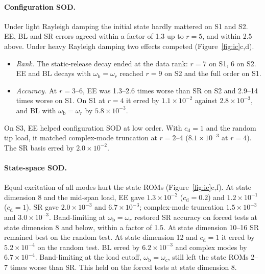 \documentclass[preprint,12pt]{elsarticle}
\begin{document}
\paragraph{Configuration SOD.} Under light Rayleigh damping the initial state hardly mattered on S1 and S2. EE, BL and SR errors agreed within a factor of 1.3 up to $r=5$, and within 2.5 above.
Under heavy Rayleigh damping two effects competed (Figure~\ref{fig:ic}c,d).
\begin{itemize}
\item \emph{Rank.} The static-release decay ended at the data rank: $r=7$ on S1, 6 on S2. EE and BL decays with $\omega_{\mathrm b}=\omega_r$ reached $r=9$ on S2 and the full order on S1.
\item \emph{Accuracy.} At $r=3$--6, EE was 1.3--2.6 times worse than SR on S2 and 2.9--14 times worse on S1. On S1 at $r=4$ it erred by $1.1\times10^{-2}$ against $2.8\times10^{-3}$, and BL with $\omega_{\mathrm b}=\omega_r$ by $5.8\times10^{-3}$.
\end{itemize}
On S3, EE helped configuration SOD at low order. With $c_{\mathrm d}=1$ and the random tip load, it matched complex-mode truncation at $r=2$--4 ($8.1\times10^{-3}$ at $r=4$). The SR basis erred by $2.0\times10^{-2}$.

\paragraph{State-space SOD.} Equal excitation of all modes hurt the state ROMs (Figure~\ref{fig:ic}e,f).
At state dimension 8 and the mid-span load, EE gave $1.3\times10^{-2}$ ($c_{\mathrm d}=0.2$) and $1.2\times10^{-1}$ ($c_{\mathrm d}=1$). SR gave $2.0\times10^{-3}$ and $6.7\times10^{-3}$; complex-mode truncation $1.5\times10^{-3}$ and $3.0\times10^{-3}$.
Band-limiting at $\omega_{\mathrm b}=\omega_r$ restored SR accuracy on forced tests at state dimension 8 and below, within a factor of 1.5. At state dimension 10--16 SR remained best on the random test. At state dimension 12 and $c_{\mathrm d}=1$ it erred by $5.2\times10^{-4}$ on the random test. BL erred by $6.2\times10^{-3}$ and complex modes by $6.7\times10^{-4}$.
Band-limiting at the load cutoff, $\omega_{\mathrm b}=\omega_{\mathrm c}$, still left the state ROMs 2--7 times worse than SR. This held on the forced tests at state dimension 8.
\end{document}
